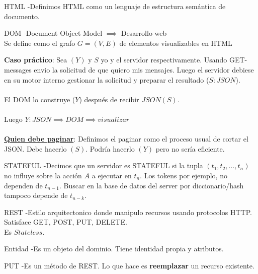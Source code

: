 \begin{Definition}{HTML}
    -Definimos HTML como un lenguaje de estructura semántica de documento.
\end{Definition}

\begin{Definition}{DOM}
    -Document Object Model $\implies $ Desarrollo web \\
    Se define como el grafo $G = (V, E)$ de elementos visualizables en HTML
\end{Definition}

\textbf{Caso práctico}: Sea $(Y)$ y $S$ yo y el servidor respectivamente. Usando GET-messages 
envio la solicitud de que quiero mis mensajes. Luego el servidor debiese en su motor interno gestionar la 
solicitud y preparar el resultado ($S: JSON$). 
\\
\\ 
El DOM lo construye ($Y$) después de recibir $JSON(S)$.
\\ 
\\
Luego $Y: JSON \implies DOM \implies visualizar$
\\
\\
\underline{\textbf{Quien debe paginar}}: Definimos el paginar como el proceso usual de cortar el JSON. 
Debe hacerlo $(S)$. Podría hacerlo $(Y)$ pero no sería eficiente.

\begin{Definition}{STATEFUL}
    -Decimos que un servidor es STATEFUL si la tupla $(t_1, t_2, \dots, t_n)$
    no influye sobre la acción $A$ a ejecutar en $t_n$. Los tokens por ejemplo, no dependen de $t_{n-1}$.
    Buscar en la base de datos del server por diccionario/hash tampoco depende de $t_{n-k}$.
\end{Definition}

\begin{Definition}{REST}
    -Estilo arquitectonico donde manipulo recursos usando protocolos HTTP.\\
    Satisface GET, POST, PUT, DELETE. \\
    Es $Stateless$.
\end{Definition}

\begin{Definition}{Entidad}
    -Es un objeto del dominio. Tiene identidad propia y atributos.
\end{Definition}

\begin{Definition}{PUT}
    -Es un método de REST. Lo que hace es \textbf{reemplazar} un recurso existente.
\end{Definition}

